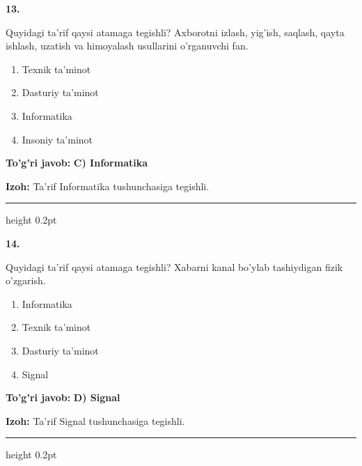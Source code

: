 \documentclass[10pt,a4paper,oneside]{article}
\begin{document}
\noindent\textbf{\color{ink}13.}
\par
Quyidagi ta'rif qaysi atamaga tegishli? Axborotni izlash, yig'ish, saqlash, qayta ishlash, uzatish va himoyalash usullarini o'rganuvchi fan.
\begin{enumerate}[label=\Alph*),leftmargin=9mm]
\item Texnik ta'minot
\item Dasturiy ta'minot
\item Informatika
\item Insoniy ta'minot
\end{enumerate}
\begin{tcolorbox}[enhanced,breakable,colback=teal!4,colframe=teal!50!black,boxrule=0.5pt,arc=1.1mm,left=3mm,right=3mm,top=1.7mm,bottom=1.7mm,before skip=2mm,after skip=2mm]
\textbf{\color{teal}To'g'ri javob:} \textbf{C) Informatika}
\par\smallskip
\textbf{Izoh:} Ta'rif Informatika tushunchasiga tegishli.
\end{tcolorbox}
\vspace{2mm}\hrule height 0.2pt \vspace{3mm}

\noindent\textbf{\color{ink}14.}
\par
Quyidagi ta'rif qaysi atamaga tegishli? Xabarni kanal bo'ylab tashiydigan fizik o'zgarish.
\begin{enumerate}[label=\Alph*),leftmargin=9mm]
\item Informatika
\item Texnik ta'minot
\item Dasturiy ta'minot
\item Signal
\end{enumerate}
\begin{tcolorbox}[enhanced,breakable,colback=teal!4,colframe=teal!50!black,boxrule=0.5pt,arc=1.1mm,left=3mm,right=3mm,top=1.7mm,bottom=1.7mm,before skip=2mm,after skip=2mm]
\textbf{\color{teal}To'g'ri javob:} \textbf{D) Signal}
\par\smallskip
\textbf{Izoh:} Ta'rif Signal tushunchasiga tegishli.
\end{tcolorbox}
\vspace{2mm}\hrule height 0.2pt \vspace{3mm}
\end{document}

